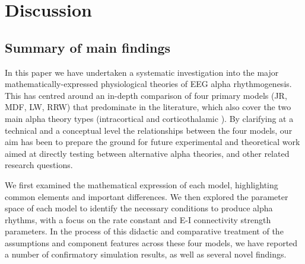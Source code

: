 \documentclass[12pt,twoside]{article}
\begin{document}


\section{Discussion}


\subsection{Summary of main findings}
In this paper we have undertaken a systematic investigation into the major mathematically-expressed physiological theories of EEG alpha rhythmogenesis. This has centred around an in-depth comparison of four primary models (JR, MDF, LW, RRW) that predominate in the literature, which also cover the two main alpha theory types (intracortical and corticothalamic \citealp{nunez2006electric}). By clarifying at a technical and a conceptual level the relationships between the four models, our aim has been to prepare the ground for future experimental and theoretical work aimed at directly testing between alternative alpha theories, and other related research questions. 

We first examined the mathematical expression of each model, highlighting common elements and important differences. We then explored the parameter space of each model to identify the necessary conditions to produce alpha rhythms, with a focus on the rate constant and E-I connectivity strength parameters. In the process of this didactic and comparative treatment of the assumptions and component features across these four models, we have reported a number of confirmatory simulation results, as well as several novel findings. 
\end{document}

